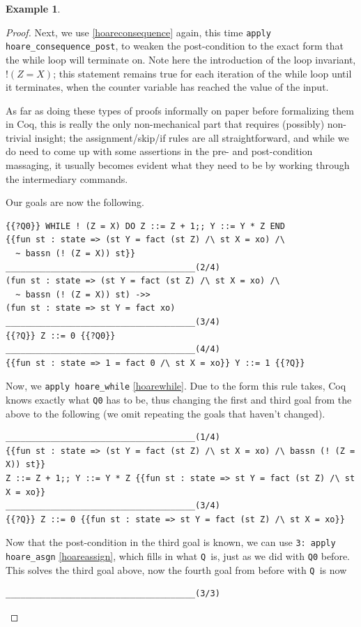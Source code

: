 \documentclass[12pt,notitlepage]{report}
\theoremstyle{plain}
\theoremstyle{definition}
\newtheorem{example}[theo]{Example}
\numberwithin{equation}{section}
\begin{document}
\begin{example}
\begin{proof}
    Next, we use \eqref{hoareconsequence} again, this time \verb$apply hoare_consequence_post$, to weaken the post-condition to the exact form that the while loop will terminate on.  Note here the introduction of the loop invariant, $!(Z=X)$; this statement remains true for each iteration of the while loop until it terminates, when the counter variable has reached the value of the input.  
    \par As far as doing these types of proofs informally on paper before formalizing them in Coq, this is really the only non-mechanical part that requires (possibly) non-trivial insight; the assignment/skip/if rules are all straightforward, and while we do need to come up with some assertions in the pre- and post-condition massaging, it usually becomes evident what they need to be by working through the intermediary commands.
    \par
    Our goals are now the following.
\begin{verbatim}
{{?Q0}} WHILE ! (Z = X) DO Z ::= Z + 1;; Y ::= Y * Z END
{{fun st : state => (st Y = fact (st Z) /\ st X = xo) /\ 
  ~ bassn (! (Z = X)) st}}
______________________________________(2/4)
(fun st : state => (st Y = fact (st Z) /\ st X = xo) /\ 
  ~ bassn (! (Z = X)) st) ->>
(fun st : state => st Y = fact xo)
______________________________________(3/4)
{{?Q}} Z ::= 0 {{?Q0}}
______________________________________(4/4)
{{fun st : state => 1 = fact 0 /\ st X = xo}} Y ::= 1 {{?Q}}
\end{verbatim}
Now, we \verb$apply hoare_while$ \eqref{hoarewhile}.  Due to the form this rule takes, Coq knows exactly what \verb$Q0$ has to be, thus changing the first and third goal from the above to the following (we omit repeating the goals that haven't changed).
\begin{verbatim}
______________________________________(1/4)
{{fun st : state => (st Y = fact (st Z) /\ st X = xo) /\ bassn (! (Z = X)) st}}
Z ::= Z + 1;; Y ::= Y * Z {{fun st : state => st Y = fact (st Z) /\ st X = xo}}
______________________________________(3/4)
{{?Q}} Z ::= 0 {{fun st : state => st Y = fact (st Z) /\ st X = xo}}
\end{verbatim}
Now that the post-condition in the third goal is known, we can use \verb$3: apply hoare_asgn$ \eqref{hoareassign}, which fills in what \verb$Q $is, just as we did with \verb$Q0$ before.  This solves the third goal above, now the fourth goal from before with \verb$Q $is now
\begin{verbatim}
______________________________________(3/3)

\end{verbatim}
\end{proof}
\end{example}
\end{document}
